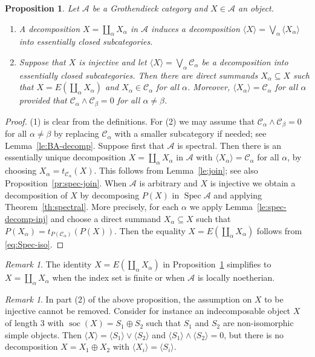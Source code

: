 \documentclass[a4paper]{amsart}
\theoremstyle{plain}
\newtheorem{prop}[thm]{Proposition}
\theoremstyle{definition}
\theoremstyle{remark}
\newtheorem{rem}[thm]{Remark}
\numberwithin{equation}{section}
\newcommand{\soc}{\operatorname{soc}}
\newcommand{\Spec}{\operatorname{Spec}}
\def\A{\mathcal A}
\def\C{\mathcal C}
\def\a{\alpha}
\def\b{\beta}
\begin{document}
\begin{prop} \label{pr:decomp}
  Let $\A$ be a Grothendieck category and $X\in\A$ an object.
  \begin{enumerate}
  \item A decomposition $X=\coprod_\a X_\a$ in $\A$ induces
  a decomposition $\langle X\rangle=\bigvee_\a\langle
  X_\a\rangle$ into  essentially closed subcategories.
\item Suppose that $X$ is injective and let
  $\langle X\rangle=\bigvee_\a\C_\a$ be a decomposition into essentially closed
  subcategories. Then there are direct summands $X_\a\subseteq X$ such
  that $X=E(\coprod_\a X_\a)$ and $X_\a\in\C_\a$ for all $\a$.
  Moreover, $\langle X_\a\rangle=\C_\a$ for all $\a$ provided that
  $\C_\a\wedge\C_\b=0$ for all $\a\neq\b$.
\end{enumerate}
\end{prop}
\begin{proof}
  (1) is clear from the definitions. For (2) we may assume that
  $\C_\a\wedge\C_\b=0$ for all $\a\neq\b$ by replacing $\C_\a$ with a
  smaller subcategory if needed; see Lemma~\ref{le:BA-decomp}.
  Suppose first that $\A$ is spectral. Then there is an essentially
  unique decomposition $X=\coprod_\a X_\a$ in $\A$ with
  $\langle X_\a\rangle=\C_\a$ for all $\a$, by choosing
  $X_\a=t_{\C_\a}(X)$. This follows from Lemma~\ref{le:join}; see also
  Proposition~\ref{pr:spec-join}. When $\A$ is arbitrary and $X$ is
  injective we obtain a decomposition of $X$ by decomposing $P(X)$ in
  $\Spec\A$ and applying Theorem~\ref{th:spectral}.  More precisely,
  for each $\a$ we apply Lemma~\ref{le:spec-decomp-inj} and choose a
  direct summand $X_\a\subseteq X$ such that
  $P(X_\a)=t_{P(\C_\a)}(P(X))$.  Then the equality
  $X=E(\coprod_\a X_\a)$ follows from \eqref{eq:Spec-iso}.
\end{proof}

\begin{rem}
  The identity $X=E(\coprod_\a X_\a)$ in Proposition~\ref{pr:decomp}
  simplifies to $X=\coprod_\a X_\a$ when the index set is finite or
  when $\A$ is locally noetherian.
\end{rem}

\begin{rem}
  In part (2) of the above proposition, the assumption on $X$ to be
  injective cannot be removed. Consider for instance an indecomposable
  object $X$ of length $3$ with $\soc(X)=S_1\oplus S_2$ such that
  $S_1$ and $S_2$ are non-isomorphic simple objects. Then
  $\langle X\rangle=\langle S_1\rangle\vee \langle S_2\rangle$ and
  $\langle S_1\rangle\wedge \langle S_2\rangle=0$, but there is no
  decomposition $X=X_1\oplus X_2$ with
  $\langle X_i\rangle=\langle S_i\rangle$.
\end{rem}
\end{document}
